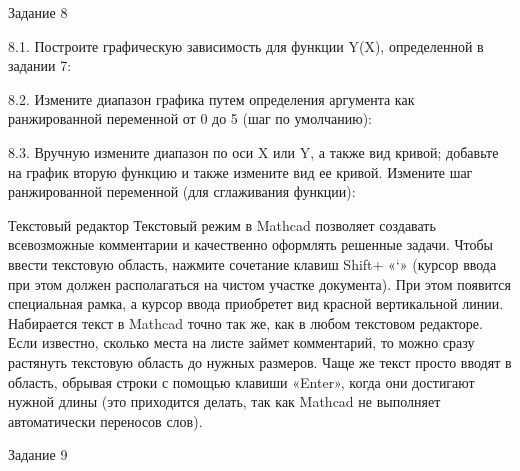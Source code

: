 Задание 8

8.1. Построите графическую зависимость для функции Y(X), определенной в задании 7:



8.2. Измените диапазон графика путем определения аргумента как ранжированной переменной от 0 до 5 (шаг по умолчанию):



8.3. Вручную измените диапазон по оси X или Y, а также вид кривой; добавьте на график вторую функцию и также измените вид ее кривой. Измените шаг ранжированной переменной (для сглаживания функции):

 		


Текстовый редактор
Текстовый режим в Mathcad позволяет создавать всевозможные комментарии и качественно оформлять решенные задачи.
Чтобы ввести текстовую область, нажмите сочетание клавиш Shift+ «‘» (курсор ввода при этом должен располагаться на чистом участке документа). При этом появится специальная рамка, а курсор ввода приобретет вид красной вертикальной линии.
Набирается текст в Mathcad точно так же, как в любом текстовом редакторе. Если известно, сколько места на листе займет комментарий, то можно сразу растянуть текстовую область до нужных размеров. Чаще же текст просто вводят в область, обрывая строки с помощью клавиши «Enter», когда они достигают нужной длины (это приходится делать, так как Mathcad не выполняет автоматически переносов слов).

Задание 9